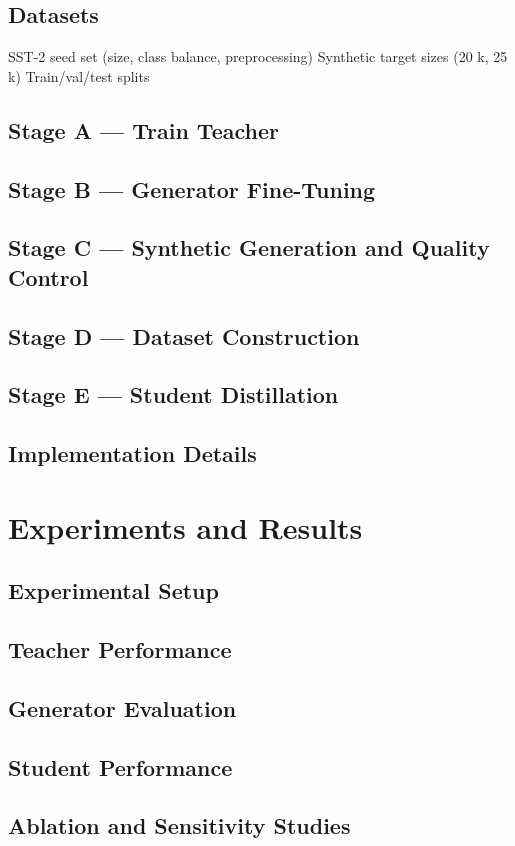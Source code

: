 \documentclass[11pt]{article}
\begin{document}
\subsection{Datasets}
SST-2 seed set (size, class balance, preprocessing)
Synthetic target sizes (20 k, 25 k)
Train/val/test splits

\subsection{Stage A — Train Teacher}
\subsection{Stage B — Generator Fine-Tuning}
\subsection{Stage C — Synthetic Generation and Quality Control}
\subsection{Stage D — Dataset Construction}
\subsection{Stage E — Student Distillation}
\subsection{Implementation Details}

\section{Experiments and Results}
\subsection{Experimental Setup}
\subsection{Teacher Performance}
\subsection{Generator Evaluation}
\subsection{Student Performance}
\subsection{Ablation and Sensitivity Studies}
\end{document}
